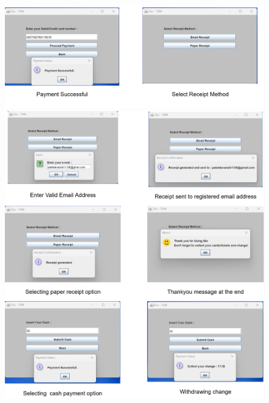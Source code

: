 \documentclass[a4paper, 11pt]{report}
\begin{document}
\begin{figure}[ht]
\centering
    \includegraphics[width=14cm]{1.2.png} 
   \includegraphics[width=14cm]{2.png} 
\end{figure}
\clearpage 
\end{document}
